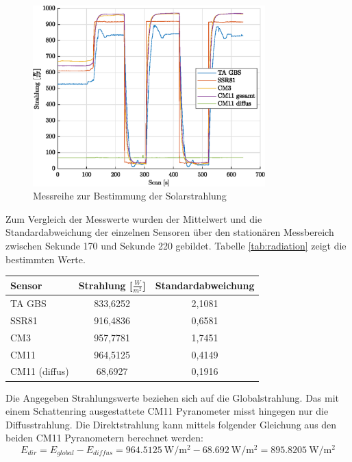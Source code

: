 \begin{figure}[H]
	\centering
	\includegraphics[width=0.8\textwidth]{../DATA/Messreihe_Strahlung.eps}
	\caption[Messreihe zur Bestimmung der Solarstrahlung]{Messreihe zur Bestimmung der Solarstrahlung}
	\label{fig:radiation}
\end{figure}
Zum Vergleich der Messwerte wurden der Mittelwert und die Standardabweichung der einzelnen Sensoren über den stationären Messbereich zwischen Sekunde 170 und Sekunde 220 gebildet. Tabelle \ref{tab:radiation} zeigt die bestimmten Werte.
\begin{center}
\begin{tabular}{l|c|c}
	\label{tab:radiation}
	
	\textbf{Sensor} & \textbf{Strahlung [$\frac{W}{m^2}$]} & \textbf{Standardabweichung}\\
	\hline
	TA GBS & 833,6252 & 2,1081\\
	SSR81 & 916,4836 & 0,6581\\
	CM3 & 957,7781 & 1,7451\\
	CM11 & 964,5125 & 0,4149\\
	CM11 (diffus) & 68,6927 & 0,1916
\end{tabular} 
\end{center}

Die Angegeben Strahlungswerte beziehen sich auf die Globalstrahlung. Das mit einem Schattenring ausgestattete CM11 Pyranometer misst hingegen nur die Diffusstrahlung. Die Direktstrahlung kann mittels folgender Gleichung aus den beiden CM11 Pyranometern berechnet werden:
\begin{equation}
	\label{eq:Edir}
	E_{dir}=E_{global}-E_{diffus}=\SI{964.5125}{\watt\per\square\meter}-\SI{68.692}{\watt\per\square\meter} = \SI{895.8205}{\watt\per\square\meter}
\end{equation}

